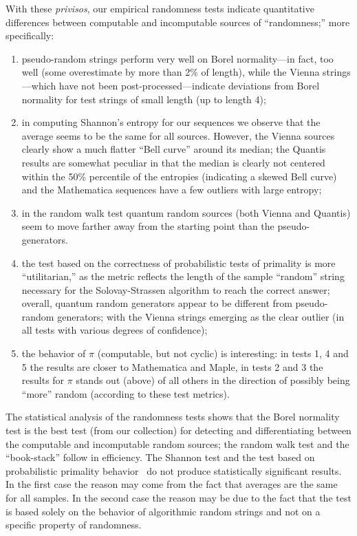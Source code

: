 \documentclass[%
 preprint,
 showpacs,
 showkeys,
 preprintnumbers,
 amsmath,amssymb,
 aps,
 prl,
  longbibliography,
 ]{revtex4-1}
\begin{document}
With these {\em privisos}, our empirical randomness tests indicate quantitative differences between computable
and incomputable sources of ``randomness;''
more specifically:
\begin{enumerate}
\item
pseudo-random strings perform very well on Borel normality---in fact, too well (some overestimate by more than 2\%
of length), while the Vienna strings---which have not been post-processed---indicate
deviations from Borel normality for test strings of small length (up to length 4);

\item in computing Shannon's entropy for our sequences we observe that
the average seems to be the same for all sources. However,
the Vienna sources clearly show a much flatter ``Bell curve'' around
its median; the Quantis results are somewhat peculiar in that the median is
clearly not centered within the 50\% percentile of the entropies
(indicating a skewed Bell curve) and the Mathematica sequences have
a few outliers with large entropy;

\item
in the random walk test quantum random sources (both Vienna and Quantis)
seem to move farther away from the starting point than the pseudo-generators.
\item
the test based on the correctness of probabilistic tests of primality is  more ``utilitarian,''
as the metric reflects the length of the sample ``random'' string necessary for the Solovay-Strassen algorithm
to reach the correct answer; overall, quantum random generators appear to be different from pseudo-random
 generators; with the Vienna strings emerging as the clear outlier
(in all tests with various degrees of confidence);

\item
the behavior of $\pi$ (computable, but not cyclic) is interesting: in tests 1, 4
and 5 the results are closer to Mathematica and Maple, in tests 2 and 3 the
results for $\pi$ stands out (above) of all others in the direction of possibly
being ``more'' random (according to these test metrics).
\end{enumerate}


The statistical analysis of the randomness tests shows that the Borel normality test is the best test
(from our collection) for detecting and differentiating between the computable and incomputable random sources;
the random walk test and the ``book-stack''  follow in efficiency.
  The Shannon test and the test based on probabilistic primality behavior~\cite{calude:02} do not produce
 statistically significant results.
In the first case the reason may come from the fact  that averages are the same for all samples. In the second case  the reason  may be due to the fact that the test is based solely on the behavior of algorithmic random strings and not on a specific property of randomness.
\end{document}
